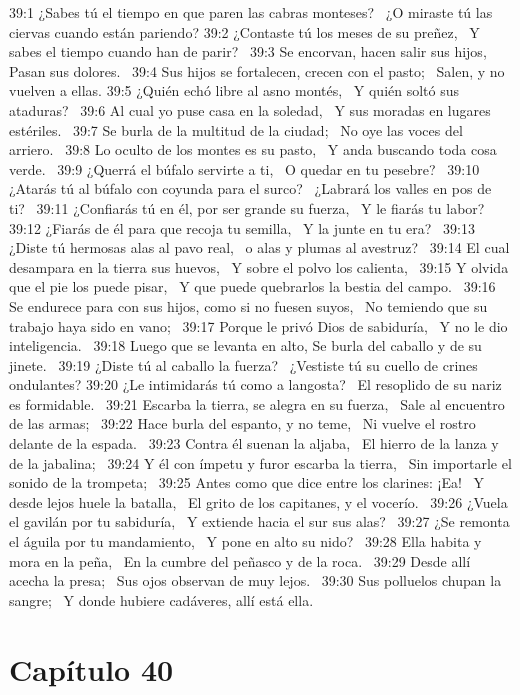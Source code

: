 39:1 ¿Sabes tú el tiempo en que paren las cabras monteses?  
¿O miraste tú las ciervas cuando están pariendo? 
39:2 ¿Contaste tú los meses de su preñez,  
Y sabes el tiempo cuando han de parir?  
39:3 Se encorvan, hacen salir sus hijos,  
Pasan sus dolores.  
39:4 Sus hijos se fortalecen, crecen con el pasto;  
Salen, y no vuelven a ellas. 
39:5 ¿Quién echó libre al asno montés,  
Y quién soltó sus ataduras?  
39:6 Al cual yo puse casa en la soledad,  
Y sus moradas en lugares estériles.  
39:7 Se burla de la multitud de la ciudad;  
No oye las voces del arriero.  
39:8 Lo oculto de los montes es su pasto,  
Y anda buscando toda cosa verde.  
39:9 ¿Querrá el búfalo servirte a ti,  
O quedar en tu pesebre?  
39:10 ¿Atarás tú al búfalo con coyunda para el surco?  
¿Labrará los valles en pos de ti?  
39:11 ¿Confiarás tú en él, por ser grande su fuerza,  
Y le fiarás tu labor? 
39:12 ¿Fiarás de él para que recoja tu semilla,  
Y la junte en tu era?  
39:13 ¿Diste tú hermosas alas al pavo real,  
o alas y plumas al avestruz?  
39:14 El cual desampara en la tierra sus huevos,  
Y sobre el polvo los calienta,  
39:15 Y olvida que el pie los puede pisar,  
Y que puede quebrarlos la bestia del campo.  
39:16 Se endurece para con sus hijos, como si no fuesen suyos,  
No temiendo que su trabajo haya sido en vano;  
39:17 Porque le privó Dios de sabiduría,  
Y no le dio inteligencia.  
39:18 Luego que se levanta en alto, 
Se burla del caballo y de su jinete.  
39:19 ¿Diste tú al caballo la fuerza?  
¿Vestiste tú su cuello de crines ondulantes? 
39:20 ¿Le intimidarás tú como a langosta?  
El resoplido de su nariz es formidable.  
39:21 Escarba la tierra, se alegra en su fuerza,  
Sale al encuentro de las armas;  
39:22 Hace burla del espanto, y no teme,  
Ni vuelve el rostro delante de la espada.  
39:23 Contra él suenan la aljaba,  
El hierro de la lanza y de la jabalina;  
39:24 Y él con ímpetu y furor escarba la tierra,  
Sin importarle el sonido de la trompeta;  
39:25 Antes como que dice entre los clarines: ¡Ea!  
Y desde lejos huele la batalla,  
El grito de los capitanes, y el vocerío.  
39:26 ¿Vuela el gavilán por tu sabiduría,  
Y extiende hacia el sur sus alas?  
39:27 ¿Se remonta el águila por tu mandamiento,  
Y pone en alto su nido?  
39:28 Ella habita y mora en la peña,  
En la cumbre del peñasco y de la roca.  
39:29 Desde allí acecha la presa;  
Sus ojos observan de muy lejos.  
39:30 Sus polluelos chupan la sangre;  
Y donde hubiere cadáveres, allí está ella.  
\section*{Capítulo 40} 

